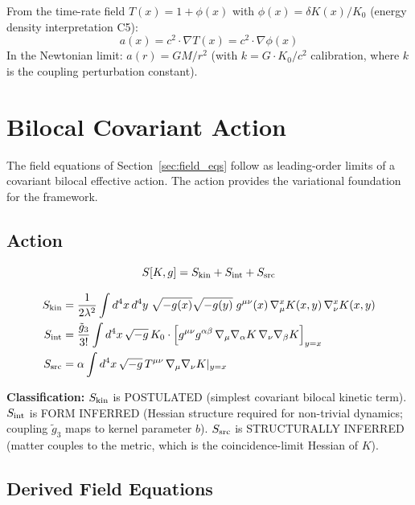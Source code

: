 \documentclass[12pt]{article}
\begin{document}
From the time-rate field $T(x) = 1 + \phi(x)$ with $\phi(x) = \delta K(x)/K_0$ (energy density interpretation C5):
\begin{equation}
a(x) = c^2 \cdot \nabla T(x) = c^2 \cdot \nabla\phi(x)
\label{eq:accel}
\end{equation}
In the Newtonian limit: $a(r) = GM/r^2$ (with $k = G\cdot K_0/c^2$ calibration, where $k$ is the coupling perturbation constant).

\section{Bilocal Covariant Action}
\label{sec:action}

The field equations of Section~\ref{sec:field_eqs} follow as leading-order limits of a covariant bilocal effective action. The action provides the variational foundation for the framework.

\subsection{Action}

\begin{equation}
S[K, g] = S_{\rm kin} + S_{\rm int} + S_{\rm src}
\end{equation}

\begin{align}
S_{\rm kin} &= \frac{1}{2\lambda^2} \int d^4x\,d^4y\;
\sqrt{-g(x)}\sqrt{-g(y)}\;
g^{\mu\nu}(x)\,\nabla^x_\mu K(x,y)\,\nabla^x_\nu K(x,y)
\label{eq:Skin} \\
S_{\rm int} &= \frac{\tilde{g}_3}{3!} \int d^4x\,\sqrt{-g}\,
K_0\cdot\Big[g^{\mu\nu}g^{\alpha\beta}\,
\nabla_\mu\nabla_\alpha K\,\nabla_\nu\nabla_\beta K\Big]_{y=x}
\label{eq:Sint} \\
S_{\rm src} &= \alpha \int d^4x\,\sqrt{-g}\,
T^{\mu\nu}\,\nabla_\mu\nabla_\nu K|_{y=x}
\label{eq:Ssrc}
\end{align}

\textbf{Classification:} $S_{\rm kin}$ is POSTULATED (simplest covariant bilocal kinetic term). $S_{\rm int}$ is FORM INFERRED (Hessian structure required for non-trivial dynamics; coupling $\tilde{g}_3$ maps to kernel parameter $b$). $S_{\rm src}$ is STRUCTURALLY INFERRED (matter couples to the metric, which is the coincidence-limit Hessian of $K$).

\subsection{Derived Field Equations}
\end{document}
